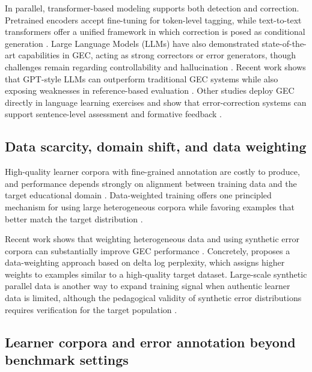 In parallel, transformer-based modeling supports both detection and correction. Pretrained encoders accept fine-tuning for token-level tagging, while text-to-text transformers offer a unified framework in which correction is posed as conditional generation \parencite{Devlin2019,Liu2019RoBERTa,Raffel2020}. Large Language Models (LLMs) have also demonstrated state-of-the-art capabilities in GEC, acting as strong correctors or error generators, though challenges remain regarding controllability and hallucination \parencite{CoyneSakaguchi2023,Bryant2023GECsurvey}. Recent work shows that GPT-style LLMs can outperform traditional GEC systems while also exposing weaknesses in reference-based evaluation \parencite{CoyneSakaguchi2023}. Other studies deploy GEC directly in language learning exercises and show that error-correction systems can support sentence-level assessment and formative feedback \parencite{Katinskaia2023}.

\subsection{Data scarcity, domain shift, and data weighting}
\label{sec:sota_gec_data}

High-quality learner corpora with fine-grained annotation are costly to produce, and performance depends strongly on alignment between training data and the target educational domain \parencite{Ng2014,Bryant2019,Bryant2023GECsurvey}. Data-weighted training offers one principled mechanism for using large heterogeneous corpora while favoring examples that better match the target distribution \parencite{Lichtarge2020}.

Recent work shows that weighting heterogeneous data and using synthetic error corpora can substantially improve GEC performance \parencite{Lichtarge2020,Bryant2023GECsurvey}. Concretely, \textcite{Lichtarge2020} proposes a data-weighting approach based on delta log perplexity, which assigns higher weights to examples similar to a high-quality target dataset. Large-scale synthetic parallel data is another way to expand training signal when authentic learner data is limited, although the pedagogical validity of synthetic error distributions requires verification for the target population \parencite{Bryant2023GECsurvey}.

\subsection{Learner corpora and error annotation beyond benchmark settings}
\label{sec:sota_gec_corpora}

